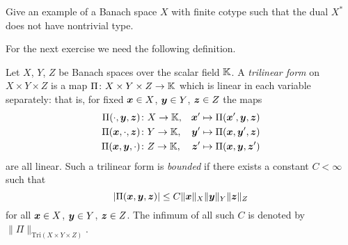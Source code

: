 \begin{exercise}
  Give an example of a Banach space $X$ with finite cotype such that the dual $X^{*}$ does not have nontrivial type.
\end{exercise}


For the next exercise we need the following definition.

\begin{defn}
  Let $X$, $Y$, $Z$ be Banach spaces over the scalar field $\mathbb{K}$.
  A \emph{trilinear form} on $X \times Y \times Z$ is a map $\Pi \colon X \times Y \times Z \rightarrow \mathbb{K}$ which is linear in each variable separately: that is, for fixed $\bm{x} \in X$, $\bm{y} \in Y$, $\bm{z} \in Z$ the maps
  \begin{equation*}
    \begin{aligned}
      \Pi(\cdot, \bm{y}, \bm{z}) &\colon X \to \mathbb{K}, &\bm{x}' \mapsto \Pi(\bm{x}',\bm{y},\bm{z}) \\
      \Pi(\bm{x}, \cdot, \bm{z}) &\colon Y \to \mathbb{K}, &\bm{y}' \mapsto \Pi(\bm{x},\bm{y}',\bm{z}) \\
      \Pi(\bm{x}, \bm{y}, \cdot) &\colon Z \to \mathbb{K}, &\bm{z}' \mapsto \Pi(\bm{x},\bm{y},\bm{z}')
  \end{aligned}
\end{equation*}
are all linear.
Such a trilinear form is \emph{bounded} if there exists a constant $C < \infty$ such that
\begin{equation*}
  |\Pi(\bm{x}, \bm{y}, \bm{z})| \leq C\|\bm{x}\|_{X} \|\bm{y}\|_{Y} \|\bm{z}\|_{Z}
\end{equation*}
for all $\bm{x} \in X$, $\bm{y} \in Y$, $\bm{z} \in Z$.
The infimum of all such $C$ is denoted by $\|\Pi\|_{\mathrm{Tri}(X \times Y \times Z)}$.
\end{defn}

